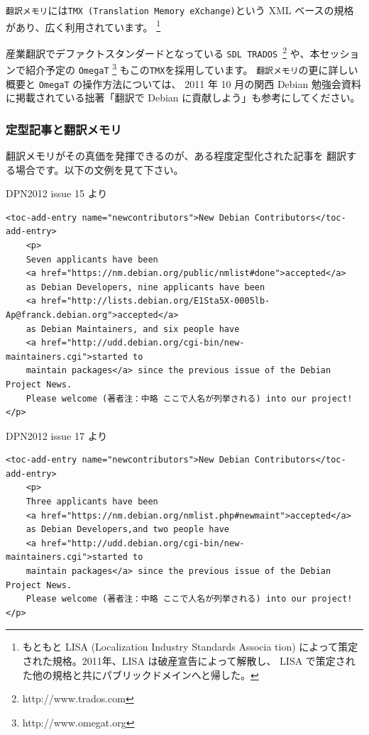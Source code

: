 \documentclass[mingoth,a4paper]{jsarticle}
\begin{document}
{\tt 翻訳メモリ}には{\tt TMX (Translation Memory eXchange)}という
XML ベースの規格があり、広く利用されています。
\footnote{もともと LISA (Localization Industry Standards Associa
	tion) によって策定された規格。2011年、LISA は破産宣告によって解散し、
	LISA で策定された他の規格と共にパブリックドメインへと帰した。}

産業翻訳でデファクトスタンダードとなっている
{\tt SDL TRADOS \textregistered}\footnote{http://www.trados.com}
や、本セッションで紹介予定の {\tt OmegaT}
\footnote{http://www.omegat.org} もこの{\tt TMX}を採用しています。
{\tt 翻訳メモリ}の更に詳しい概要と {\tt OmegaT} の操作方法については、
2011 年 10 月の関西 Debian 勉強会資料に掲載されている拙著「翻訳で Debian
に貢献しよう」も参考にしてください。

\subsubsection{定型記事と翻訳メモリ}
翻訳メモリがその真価を発揮できるのが、ある程度定型化された記事を
翻訳する場合です。以下の文例を見て下さい。

\begin{itembox}[c]{DPN2012 issue 15 より}
    \begin{verbatim}
<toc-add-entry name="newcontributors">New Debian Contributors</toc-add-entry>
	<p>
    Seven applicants have been
    <a href="https://nm.debian.org/public/nmlist#done">accepted</a>
    as Debian Developers, nine applicants have been
    <a href="http://lists.debian.org/E1Sta5X-0005lb-Ap@franck.debian.org">accepted</a>
    as Debian Maintainers, and six people have
    <a href="http://udd.debian.org/cgi-bin/new-maintainers.cgi">started to
    maintain packages</a> since the previous issue of the Debian Project News.
    Please welcome (著者注：中略 ここで人名が列挙される) into our project!</p>
    \end{verbatim}
\end{itembox}
\begin{itembox}[c]{DPN2012 issue 17 より}
    \begin{verbatim}
<toc-add-entry name="newcontributors">New Debian Contributors</toc-add-entry>
	<p>
    Three applicants have been
    <a href="https://nm.debian.org/nmlist.php#newmaint">accepted</a>
	as Debian Developers,and two people have
    <a href="http://udd.debian.org/cgi-bin/new-maintainers.cgi">started to
    maintain packages</a> since the previous issue of the Debian Project News.
    Please welcome (著者注：中略 ここで人名が列挙される) into our project!</p>
    \end{verbatim}
\end{itembox}
\end{document}
